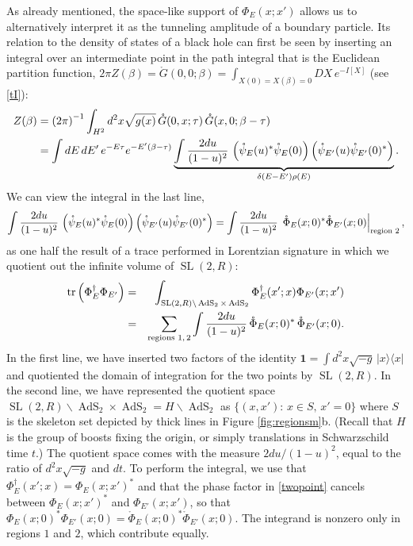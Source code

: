 \documentclass[12pt]{article}
\newcommand{\be}{\begin{equation}}
\newcommand{\ee}{\end{equation}}
\newcommand{\bea}{\begin{eqnarray}}
\newcommand{\eea}{\end{eqnarray}}
\newcommand{\nn}{\nonumber\\}
\newcommand{\lt}{\left}
\newcommand{\rt}{\right}
\newcommand*{\bra}[1]{\langle{#1}|}
\newcommand*{\ket}[1]{|{#1}\rangle}
\newcommand{\RR}{\mathbb{R}}
\DeclareMathOperator{\tr}{tr}
\DeclareMathOperator{\tSL}{\widetilde{\mathrm{SL}}}
\DeclareMathOperator{\tAdS}{\widetilde{AdS}}
\DeclareMathOperator{\HH}{H}
\newcommand{\unit}{\mathbf{1}}
\newcommand{\de}{\delta}
\newcommand{\ov}{\over}
\def\widetilde#1{#1}%
\def\HH{H}
\def\RR{R}
\begin{document}
As already mentioned, the space-like support of $\Phi_E(x; x')$ allows us to alternatively interpret it as the tunneling amplitude of a boundary particle. Its relation to the density of states of a black hole can first be seen by inserting an integral over an intermediate point in the path integral that is the Euclidean partition function, $2\pi Z(\beta)=\mathring{G}(0,0;\beta)=\int_{X(0)=X(\beta)=0} DX\, e^{-I[X]}$ (see \eqref{tI}):
\begin{equation}\label{Zlong}
\begin{aligned}
Z(\beta)&=\lt(2\pi\rt)^{-1}\int_{\HH^2} d^2x \sqrt{g(x)}\, \mathring{G}(0, x; \tau)\,\mathring{G}(x,0;\beta-\tau)\\
&=\int dE\, dE'\, e^{-E\tau}e^{-E'(\beta-\tau)}\underbrace{\int{2du \ov (1-u)^2}\, \lt(\mathring{\psi}_E(u)^* \mathring{\psi}_E(0)\rt) \lt(\mathring{\psi}_{E'}(u) \mathring{\psi}_{E'}(0)^*\rt)}_{\de(E-E')\rho(E)}.
\end{aligned}
\end{equation}
We can view the integral in the last line,
\be \label{trans}
\int{2du \ov (1-u)^2}\, \lt(\mathring{\psi}_E(u)^* \mathring{\psi}_E(0)\rt) \lt(\mathring{\psi}_{E'}(u) \mathring{\psi}_{E'}(0)^*\rt)=\int{2du \ov (1-u)^2}\, \left.\mathring{\Phi}_E(x;0)^* \mathring{\Phi}_{E'}(x;0) \right|_{\text{region $2$}},
\ee 
as one half the result of a trace performed in Lorentzian signature in which we quotient out the infinite volume of $\tSL(2,\RR)$:
\bea \label{trexp}
\tr\lt(\Phi_E^{\dagger}\Phi_{E'}\rt)&=&\int_{\tSL(2,\RR)\backslash \tAdS_2 \times \tAdS_2}\Phi^{\dagger}_E(x'; x)\Phi_{E'}(x; x')\nn
&=&\sum_{\text{regions $1,2$}}\int{2 du \ov (1-u)^2}\, \mathring{\Phi}_{E}(x;0)^*\, \mathring{\Phi}_{E'}(x;0).
\eea
In the first line, we have inserted two factors of the identity $\unit=\int d^2x \sqrt{-g}\,\ket{x}\bra{x}$ and quotiented the domain of integration for the two points by $\tSL(2,\RR)$. In the second line, we have represented the quotient space $\tSL(2,\RR)\backslash \tAdS_2 \times \tAdS_2=H\backslash \tAdS_2$ as $\{(x, x'):\, x\in S,\, x'=0\}$ where $S$ is the skeleton set depicted by thick lines in Figure \ref{fig:regionsm}b. (Recall that $H$ is the group of boosts fixing the origin, or simply translations in Schwarzschild time $t$.) The quotient space comes with the measure $2du/(1-u)^2$, equal to the ratio of $d^2x\sqrt{-g}$ and $dt$. To perform the integral, we use that $\Phi_E^{\dagger}(x'; x)=\Phi_E(x; x')^*$ and that the phase factor in \eqref{twopoint} cancels between $\Phi_E(x;x')^*$ and $\Phi_{E'}(x;x')$, so that $\Phi_{E}(x;0)^* \Phi_{E'}(x;0)=\mathring{\Phi}_E(x;0)^*\mathring{\Phi}_{E'}(x;0)$.
The integrand is nonzero only in regions $1$ and $2$, which contribute equally.
\end{document}
